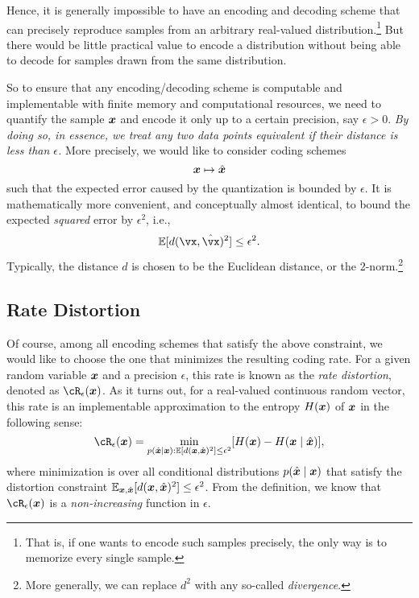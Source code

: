 \documentclass[../../book-main.tex]{subfiles}
\begin{document}
Hence, it is generally impossible to have an encoding and decoding scheme that can precisely reproduce samples from an arbitrary real-valued distribution.\footnote{That is, if one wants to encode such samples precisely, the only way is to memorize every single sample. } But there would be little practical value to encode a distribution without being able to decode for samples drawn from the same distribution.

So to ensure that any encoding/decoding scheme is computable and implementable
with finite memory and computational resources, we need to quantify the sample $\bm{x}$ and encode it only up to a certain precision, say $\epsilon > 0$. {\em By doing so, in essence, we treat any two data points equivalent if their distance is less than $\epsilon$.} More precisely, we would like to consider coding schemes
\begin{equation}
	\bm{x} \mapsto \hat {\bm{x}}
\end{equation}
such that the expected error caused by the quantization is bounded by $\epsilon$. It is mathematically more convenient, and conceptually almost identical, to bound the expected \textit{squared} error by \(\epsilon^{2}\), i.e., 
\begin{equation}
	\Ex[d(\vx, \hat \vx)^{2}] \le \epsilon^{2}.
\end{equation}
Typically, the distance \(d\) is chosen to be the Euclidean distance, or the 2-norm.\footnote{More generally, we can replace \(d^{2}\) with any so-called \textit{divergence}.}

\subsection{Rate Distortion}
Of course, among all encoding schemes that satisfy the above constraint, we would like to choose the one that minimizes the resulting coding rate. For a given random variable $\bm{x}$ and a precision $\epsilon$, this rate is known as the {\em rate distortion}, denoted as $\cR_{\epsilon}(\x)$. As it turns out, for a real-valued continuous random vector, this rate is an implementable approximation to the entropy $H(\bm{x})$ of $\bm{x}$ in the following sense:
\begin{equation}
	\cR_{\epsilon}(\x) = \min_{p(\hat \x \mid \x): \Ex[d(\x, \hat \x)^{2}] \le \epsilon^{2}} [H(\x) - H(\x \mid \hat{\x})],
    \label{eqn:rate-distortion-general}
\end{equation}
where minimization is over all conditional distributions $p(\hat {\bm{x}} \mid \bm{x})$ that satisfy the distortion constraint $\operatorname{\mathbb{E}}_{\bm{x}, \hat {\bm{x}}}[d(\bm{x}, \hat {\bm{x}})^{2}] \le \epsilon^{2}$. From the definition, we know that $\cR_{\epsilon}(\x)$ is a {\em non-increasing} function in $\epsilon$.
\end{document}
